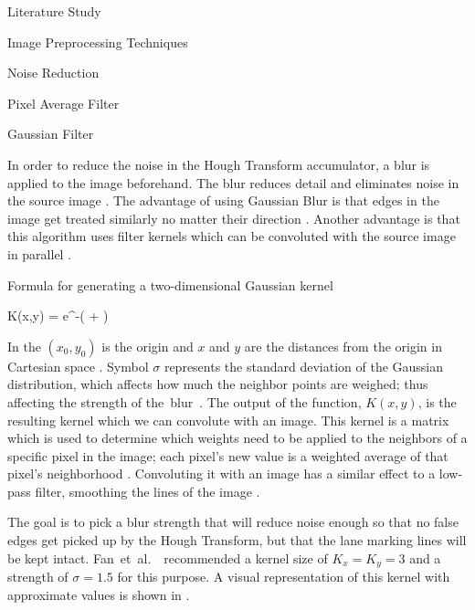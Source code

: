 \documentclass{matthijs}
\begin{document}
\begin{hoofdstuk}{Literature Study}
\begin{paragraaf}{Image Preprocessing Techniques}
\begin{subparagraaf}{Noise Reduction}
\begin{subsubparagraaf}{Pixel Average Filter}
				\end{subsubparagraaf}

				\begin{subsubparagraaf}{Gaussian Filter}

					In order to reduce the noise in the Hough Transform accumulator, a blur is applied to the image beforehand.
					The blur reduces detail and eliminates noise in the source image \cite{fan2016faster}.
					The advantage of using Gaussian Blur is that edges in the image get treated similarly no matter their direction \cite{waltz1998efficient}.
					Another advantage is that this algorithm uses filter kernels which can be convoluted with the source image in parallel \cite{stroem2016parallel}.
					
					\begin{figuur}{Formula for generating a two-dimensional Gaussian kernel}

						\begin{largequation}
							K(x,y) = e^{-( + )}
						\end{largequation}\cite{gedraite2011investigation}
					
					\end{figuur}

					\bigskip

					In  the $ (x_0,y_0) $ is the origin and $x$ and $y$ are the distances from the origin in Cartesian space \cite{gedraite2011investigation}.
					Symbol $\sigma$ represents the standard deviation of the Gaussian distribution, which affects how much the neighbor points are weighed; thus affecting the strength of \mbox{the blur \cite{haddad1991class}.}
					The output of the function, $K(x,y)$, is the resulting kernel which we can convolute with an image.
					This kernel is a matrix which is used to determine which weights need to be applied to the neighbors of a specific pixel in the image; each pixel's new value is a weighted average of that pixel's neighborhood \cite{gedraite2011investigation}.
					Convoluting it with an image has a similar effect to a low-pass filter, smoothing the lines of the image \cite{haddad1991class}\cite{ferreira2010imagej}.

					\bigskip

					The goal is to pick a blur strength that will reduce noise enough so that no false edges get picked up by the Hough Transform, but that the lane marking lines will be kept intact.
					\mbox{Fan et al. \cite{fan2016faster} recommended} a kernel size of $ K_x = K_y = 3 $ and a strength of $ \sigma = 1.5 $ for this purpose.
					A visual representation of this kernel with approximate values is shown in .
					

\end{subsubparagraaf}
\end{subparagraaf}
\end{paragraaf}
\end{hoofdstuk}
\end{document}
